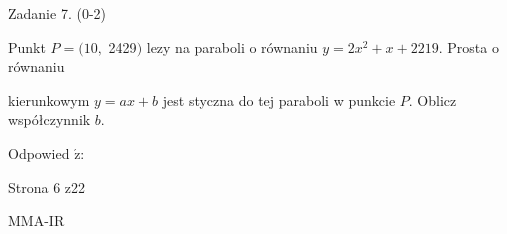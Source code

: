 \documentclass[a4paper,12pt]{article}
\begin{document}
Zadanie 7. (0-2)

Punkt $P=(10,$ 2429$)$ lezy na paraboli o równaniu $y=2x^{2}+x+2219$. Prosta o równaniu

kierunkowym $y=ax+b$ jest styczna do tej paraboli w punkcie $P$. Oblicz współczynnik $b.$

Odpowied $\acute{\mathrm{z}}$:

Strona 6 z22

MMA-IR
\end{document}
